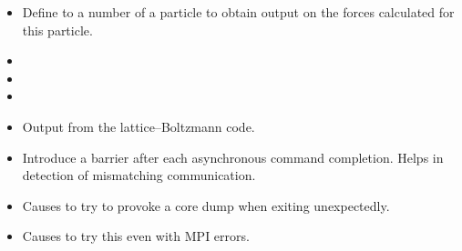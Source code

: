 \begin{itemize}
\item {} Define to a number of a particle to
  obtain output on the forces calculated for this particle.
\item {}
\item {}
\item {}
\item {} Output from the lattice--Boltzmann code.
\item {} Introduce a barrier after each
  asynchronous command completion. Helps in detection of mismatching
  communication.
\item {} Causes \es{} to try to provoke a core dump
  when exiting unexpectedly.
\item {} Causes \es{} to try this even with MPI errors.
\end{itemize}

